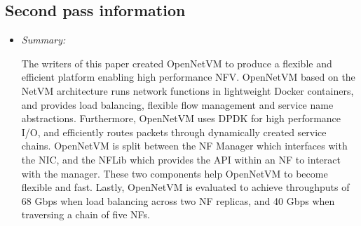 \documentclass[letterpaper,twocolumn,10pt]{article}
\begin{document}
\subsection{Second pass information}
\label{sec:second}

\begin{itemize}

\item {\it Summary:} 

The writers of this paper created OpenNetVM to produce a flexible and efficient platform enabling high 
performance NFV. OpenNetVM based on the NetVM architecture runs network functions in lightweight 
Docker containers, and provides load balancing, flexible flow management and service name abstractions.
Furthermore, OpenNetVM uses DPDK for high performance I/O, and efficiently routes packets through 
dynamically created service chains. OpenNetVM is split between the NF Manager which interfaces with the 
NIC, and the NFLib which provides the API within an NF to interact with the manager. These two components
help OpenNetVM to become flexible and fast. Lastly, OpenNetVM is evaluated to achieve throughputs of 68
Gbps when load balancing across two NF replicas, and 40 Gbps when traversing a chain of five NFs.

\end{itemize}
\end{document}
